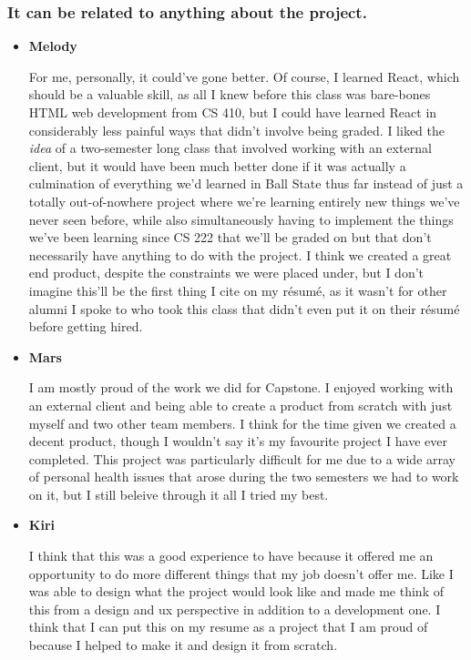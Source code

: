\documentclass[12pt, letterpaper]{article}
\begin{document}
\subsubsection{It can be related to anything about the project.}
\begin{itemize}
	\item{\textbf{Melody}}
	
		For me, personally, it could've gone better. Of course, I learned React, which should be a valuable skill, 
		as all I knew before this class was bare-bones HTML web development from CS 410, but I could have learned 
		React in considerably less painful ways that didn't involve being graded. I liked the \emph{idea} of a 
		two-semester long class that involved working with an external client, but it would have been much better 
		done if it was actually a culmination of everything we'd learned in Ball State thus far instead of just 
		a totally out-of-nowhere project where we're learning entirely new things we've never seen before, while 
		also simultaneously having to implement the things we've been learning since CS 222 that we'll be graded on but that 
		don't necessarily have anything to do with the project. I think we created a great end product, despite the 
		constraints we were placed under, but I don't imagine this'll be the first thing I cite on my résumé, as it 
		wasn't for other alumni I spoke to who took this class that didn't even put it on their résumé before getting 
		hired.
	
	\item{\textbf{Mars}}
	
		I am mostly proud of the work we did for Capstone. I enjoyed working with an external client and being able to create a product from scratch with just myself and two other team members. I think for the time given we created a decent product, though I wouldn't say it's my favourite project I have ever completed. This project was particularly difficult for me due to a wide array of personal health issues that arose during the two semesters we had to work on it, but I still beleive through it all I tried my best. 
	
	\item{\textbf{Kiri}}
	
		I think that this was a good experience to have because it offered me an opportunity to do more different things that my job doesn't offer me. Like I was able to design what the project would look like and made me think of this from a design and ux perspective in addition to a development one. I think that I can put this on my resume as a project that I am proud of because I helped to make it and design it from scratch.
\end{itemize}
\end{document}
